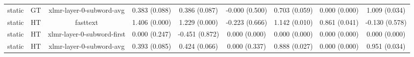 \begin{sidewaystable}[htb]
\begin{tabular}{@{}ccccccccc@{}}
        static & GT & xlmr-layer-0-subword-avg & 0.383 (0.088) & 0.386 (0.087) & -0.000 (0.500) & 0.703 (0.059) & 0.000 (0.000) & 1.009 (0.034) \\
        static & HT & fasttext & 1.406 (0.000) & 1.229 (0.000) & -0.223 (0.666) & 1.142 (0.010) & 0.861 (0.041) & -0.130 (0.578) \\
        static & HT & xlmr-layer-0-subword-first & 0.000 (0.247) & -0.451 (0.872) & 0.000 (0.000) & 0.000 (0.000) & 0.000 (0.000) & 0.000 (0.000) \\
        static & HT & xlmr-layer-0-subword-avg & 0.393 (0.085) & 0.424 (0.066) & 0.000 (0.337) & 0.888 (0.027) & 0.000 (0.000) & 0.951 (0.034) \\
        \bottomrule
    \end{tabular}
\end{sidewaystable}